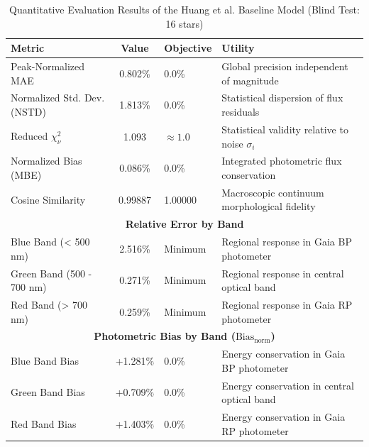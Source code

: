 
\begin{table}[htpb]
\centering
\caption{Quantitative Evaluation Results of the Huang et al. Baseline Model (Blind Test: 16 stars)}
\label{tab:huang et al. baseline_evaluation}
\begin{tabular}{lcll}
\hline
\textbf{Metric} & \textbf{Value} & \textbf{Objective} & \textbf{Utility} \\
\hline
Peak-Normalized MAE & 0.802\% & 0.0\% & Global precision independent of magnitude \\
Normalized Std. Dev. (NSTD) & 1.813\% & 0.0\% & Statistical dispersion of flux residuals \\
Reduced $\chi^2_\nu$ & 1.093 & $\approx 1.0$ & Statistical validity relative to noise $\sigma_i$ \\
Normalized Bias (MBE) & 0.086\% & 0.0\% & Integrated photometric flux conservation \\
Cosine Similarity & 0.99887 & 1.00000 & Macroscopic continuum morphological fidelity \\
\hline
\multicolumn{4}{c}{\textbf{Relative Error by Band}} \\
\hline
Blue Band (< 500 nm) & 2.516\% & Minimum & Regional response in Gaia BP photometer \\
Green Band (500 - 700 nm) & 0.271\% & Minimum & Regional response in central optical band \\
Red Band (> 700 nm) & 0.259\% & Minimum & Regional response in Gaia RP photometer \\
\hline
\multicolumn{4}{c}{\textbf{Photometric Bias by Band ($\text{Bias}_{\text{norm}}$)}} \\
\hline
Blue Band Bias & +1.281\% & 0.0\% & Energy conservation in Gaia BP photometer \\
Green Band Bias & +0.709\% & 0.0\% & Energy conservation in central optical band \\
Red Band Bias & +1.403\% & 0.0\% & Energy conservation in Gaia RP photometer \\
\hline
\end{tabular}
\end{table}
